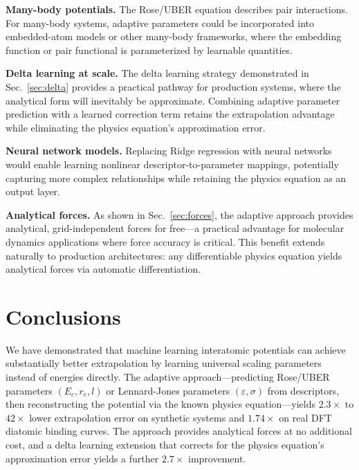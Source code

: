 \documentclass[aps,prb,twocolumn,superscriptaddress,longbibliography,floatfix]{revtex4-2}
\begin{document}
\textbf{Many-body potentials.} The Rose/UBER equation describes pair interactions. For many-body systems, adaptive parameters could be incorporated into embedded-atom models or other many-body frameworks, where the embedding function or pair functional is parameterized by learnable quantities.

\textbf{Delta learning at scale.} The delta learning strategy demonstrated in Sec.~\ref{sec:delta} provides a practical pathway for production systems, where the analytical form will inevitably be approximate. Combining adaptive parameter prediction with a learned correction term retains the extrapolation advantage while eliminating the physics equation's approximation error.

\textbf{Neural network models.} Replacing Ridge regression with neural networks would enable learning nonlinear descriptor-to-parameter mappings, potentially capturing more complex relationships while retaining the physics equation as an output layer.

\textbf{Analytical forces.} As shown in Sec.~\ref{sec:forces}, the adaptive approach provides analytical, grid-independent forces for free---a practical advantage for molecular dynamics applications where force accuracy is critical. This benefit extends naturally to production architectures: any differentiable physics equation yields analytical forces via automatic differentiation.


\section{Conclusions}
\label{sec:conclusions}

We have demonstrated that machine learning interatomic potentials can achieve substantially better extrapolation by learning universal scaling parameters instead of energies directly. The adaptive approach---predicting Rose/UBER parameters $(E_c, r_e, l)$ or Lennard-Jones parameters $(\varepsilon, \sigma)$ from descriptors, then reconstructing the potential via the known physics equation---yields $2.3\times$ to $42\times$ lower extrapolation error on synthetic systems and $1.74\times$ on real DFT diatomic binding curves. The approach provides analytical forces at no additional cost, and a delta learning extension that corrects for the physics equation's approximation error yields a further $2.7\times$ improvement.
\end{document}
